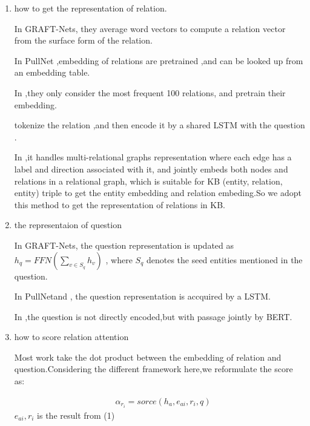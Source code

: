 \documentclass[sigconf]{acmart}
\begin{document}
   	\begin{enumerate}[(1)]
   		
   	\item how to get the representation of relation.
   	
	   	In GRAFT-Nets\cite{sun2018open}, they average word
	   	vectors to compute a relation vector  from the
	   	surface form of the relation.
	   	
	   	In PullNet\cite{sun2019pullnet} ,embedding of  relations are pretrained ,and can be looked up from an embedding table.
	   	
	   	In \cite{min2019knowledge} ,they only consider the most frequent 100 relations, and pretrain their embedding.	
	   	
	   	 \cite{xiong2019improving} tokenize the relation ,and then  encode it by a shared LSTM with the question .
	   
	   	
	   	In \cite{2020Composition},it handles multi-relational graphs  representation where each edge has a label and direction associated with it, and jointly embeds both nodes and relations in a relational graph, which is suitable for KB (entity, relation, entity) triple to get the entity embedding and relation embeding.So we adopt this method to get the representation of relations in KB.
   	
   	\item the representaion of question
   	
   		In GRAFT-Nets\cite{sun2018open},
   		the question representation is updated as
   		$h_q = FFN(\sum_{v\in S_q}h_v)$
   		, where $S_q$ denotes the seed entities mentioned in the question.
   		
   		In PullNet\cite{sun2019pullnet}and \cite{xiong2019improving} ,	the question representation is accquired by a LSTM.
   		
   		In \cite{min2019knowledge} ,the question is not directly encoded,but with passage jointly by BERT.
   		
   		
   	
   	
   	\item how to score relation attention
   	
	   	Most work take the dot product between the embedding of relation and question.Considering the different framework here,we reformulate the score as:
	   	 
	   	 \begin{displaymath}
	   	 	\begin{aligned}
	   	 		&\alpha_{r_i} = sorce( h_{a},e_{ai},r_i,q)    	 		
	   	 	\end{aligned}
	   	 \end{displaymath}
	    $e_{ai},r_i$ is the result from (1)
   	
   	
   	
   	
   	
   \end{enumerate} 
   	

	
	
	
	
	
	
\end{document}

